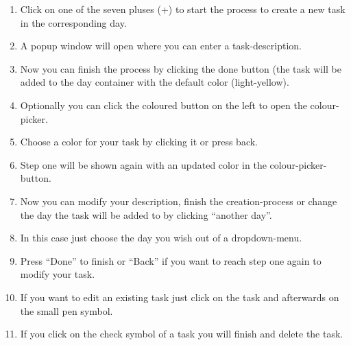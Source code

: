 \begin{enumerate}
	\item Click on one of the seven pluses (+) to start the process to create a new task in the corresponding day. 
	\item A popup window will open where you can enter a task-description.
	\item Now you can finish the process by clicking the done button (the task will be added to the day container with the default color (light-yellow). 
	\item Optionally you can click the coloured button on the left to open the colour-picker.
	\item Choose a color for your task by clicking it or press back. 
	\item Step one will be shown again with an updated color in the colour-picker-button.
	\item Now you can modify your description, finish the creation-process or change the day the task will be added to by clicking “another day”.
	\item In this case just choose the day you wish out of a dropdown-menu.
	\item Press “Done” to finish or “Back” if you want to reach step one again to modify your task.
	\item If you want to edit an existing task just click on the task and afterwards on the small pen symbol.
	\item If you click on the check symbol of a task you will finish and delete the task.
\end{enumerate}
